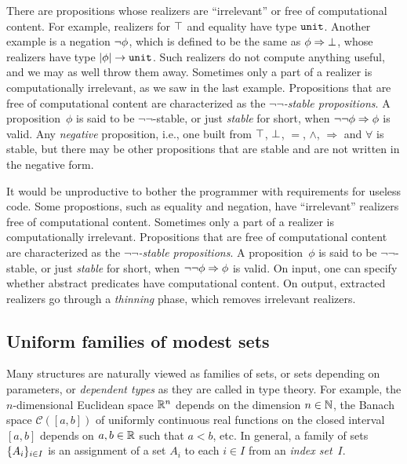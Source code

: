 \iflong
There are propositions whose realizers are ``irrelevant'' or free of
computational content. For example, realizers for $\top$ and
equality have type $\mathtt{unit}$. Another example is a negation
$\lnot \phi$, which is defined to be the same as
$\phi\Rightarrow \bot$, whose realizers have type
$|\phi| \to \mathtt{unit}$. Such realizers do not compute
anything useful, and we may as well throw them away. Sometimes only a
part of a realizer is computationally irrelevant, as we saw in the
last example. Propositions that are free of computational content
are characterized as the \emph{$\lnot\lnot$-stable propositions}. A
proposition~$\phi$ is said to be $\lnot\lnot$-stable, or just
\emph{stable} for short, when $\lnot \lnot \phi\Rightarrow \phi$ is
valid. Any \emph{negative} proposition, i.e., one built from $\top$,
$\bot$, $=$, $\land$, $\Rightarrow$ and $\forall$ is stable, but
there may be other propositions that are stable and are not written
in the negative form.

It would be unproductive to bother the programmer with requirements
for useless code.
%
\else
%
Some propostions, such as equality and negation, have ``irrelevant'' realizers
free of computational content. Sometimes only a
part of a realizer is computationally irrelevant. 
Propositions that are free of computational content are
characterized as the \emph{$\lnot\lnot$-stable propositions}. A
proposition~$\phi$ is said to be $\lnot\lnot$-stable, or just
\emph{stable} for short, when $\lnot \lnot \phi\Rightarrow \phi$ is
valid.
%
\fi
%
On input, one can specify whether abstract predicates
have computational content. On output, extracted realizers
go through a \emph{thinning} phase, which removes
irrelevant realizers.


\iflong
\subsection{Uniform families of modest sets}
\fi %
\label{sec:uniform-families}

Many structures are naturally viewed as families of sets, or sets
depending on parameters, or \emph{dependent types} as they are called
in type theory. For example, the $n$-dimensional Euclidean space
$\mathbb{R}^n$ depends on the dimension $n \in \mathbb{N}$, the Banach space
$\mathcal{C}([a,b])$ of uniformly continuous real functions on the
closed interval $[a,b]$ depends on $a, b \in \mathbb{R}$ such that $a < b$,
etc. In general, a family of sets $\{A_i\}_{i \in I}$ is an
assignment of a set $A_i$ to each $i \in I$ from an \emph{index
  set}~$I$.

